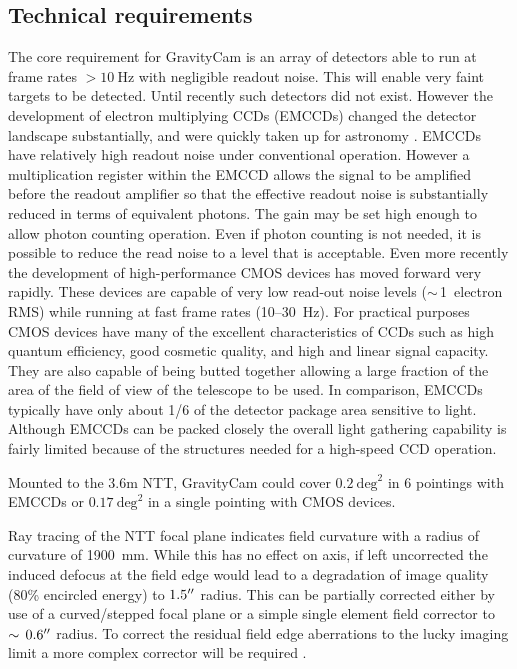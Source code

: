 \documentclass{pasa}%
\newcommand\arcmin{\hbox{$^\prime$}}
\newcommand\arcsec{\hbox{$^{\prime\prime}$}}
\begin{document}
\subsection{Technical requirements}

The core requirement for \mbox{GravityCam} is an array of detectors able to run at frame rates $> 10~\mbox{Hz}$ with negligible readout noise.  This will enable very faint targets to be detected.  Until recently such detectors did not exist.  However the development of electron multiplying CCDs (EMCCDs) changed the detector landscape substantially, and were quickly taken up for astronomy \citep{Mackay+2001}. EMCCDs have relatively high readout noise under conventional operation.  However a multiplication register within the EMCCD allows the signal to be amplified before the readout amplifier so that the effective readout noise is substantially reduced in terms of equivalent photons.  The gain may be set high enough to allow photon counting operation.  Even if photon counting is not needed, it is possible to reduce the read noise to a level that is acceptable.  Even more recently the development of high-performance CMOS devices has moved forward very rapidly.  These devices are capable of very low read-out noise levels ($\sim\,$1~electron RMS) while running at fast frame rates (10--30~Hz).  For practical purposes CMOS devices have many of the excellent characteristics of CCDs such as high quantum efficiency, good cosmetic quality, and high and linear signal capacity.  They are also capable of being butted together allowing a large fraction of the area of the field of view of the telescope to be used.  In comparison, EMCCDs typically have only about 1/6 of the detector package area sensitive to light. Although EMCCDs can be packed closely the overall light gathering capability is fairly limited because of the structures needed for a high-speed CCD operation.

Mounted to the 3.6m NTT, GravityCam could cover %
$0.2~\mbox{deg}^2$ in 6 pointings with EMCCDs or $0.17~\mbox{deg}^2$ in a single pointing with CMOS devices.

Ray tracing of the NTT focal plane indicates field curvature with a radius of curvature of 1900~mm. While this has no effect on axis, if left uncorrected the induced defocus at the field edge would lead to a degradation of image quality (80\% encircled energy) to $1.5\arcsec$ radius. This can be partially corrected either by use of a curved/stepped focal plane or a simple single element field corrector to $\sim\,0.6\arcsec$ radius.  To correct the residual field edge aberrations to the lucky imaging limit a more complex corrector will be required \citep{Wynne1968}.
\end{document}

